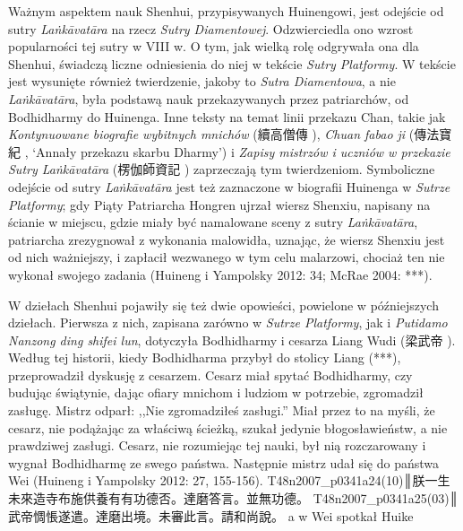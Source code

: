 Ważnym aspektem nauk Shenhui, przypisywanych Huinengowi, jest odejście od sutry \textit{La\.nkā\-vatāra} na rzecz \textit{Sutry Diamentowej}. Odzwierciedla ono wzrost popularności tej sutry w VIII w. O tym, jak wielką rolę odgrywała ona dla Shenhui, świadczą liczne odniesienia do niej w tekście \textit{Sutry Platformy}. W tekście jest wysunięte również twierdzenie, jakoby to \textit{Sutra Diamentowa}, a nie \textit{La\.nkāvatāra}, była podstawą nauk przekazywanych przez patriarchów, od Bodhidharmy do Huinenga. Inne teksty na temat linii przekazu Chan, takie jak \textit{Kontynuowane biografie wybitnych mnichów} (續高僧傳 ), \textit{Chuan fabao ji} (傳法寶紀 , `Annały przekazu skarbu Dharmy') i \textit{Zapisy mistrzów i uczniów w przekazie Sutry La\.nkāvatāra} (楞伽師資記 ) zaprzeczają tym twierdzeniom. Symboliczne odejście od sutry \textit{La\.nkāvatāra} jest też zaznaczone w biografii Huinenga w \textit{Sutrze Platformy}; gdy Piąty Patriarcha Hongren ujrzał wiersz Shenxiu, napisany na ścianie w miejscu, gdzie miały być namalowane sceny z sutry \textit{La\.nkāvatāra}, patriarcha zrezygnował z wykonania malowidła, uznając, że wiersz Shenxiu jest od nich ważniejszy, i zapłacił wezwanego w tym celu malarzowi, chociaż ten nie wykonał swojego zadania (Huineng i Yampolsky 2012: 34; McRae 2004: ***).

W dziełach Shenhui pojawiły się też dwie opowieści, powielone w późniejszych dziełach. Pierwsza z nich, zapisana zarówno w \textit{Sutrze Platformy}, jak i \textit{Putidamo Nanzong ding shifei lun}, dotyczyła Bodhidharmy i cesarza Liang Wudi (梁武帝 ). Według tej historii, kiedy Bodhidharma przybył do stolicy Liang (***), przeprowadził dyskusję z cesarzem. Cesarz miał spytać Bodhidharmy, czy budując świątynie, dając ofiary mnichom i ludziom w potrzebie, zgromadził zasługę\fnm. Mistrz odparł: ,,Nie zgromadziłeś zasługi.'' Miał przez to na myśli, że cesarz, nie podążając za właściwą ścieżką, szukał jedynie błogosławieństw, a nie prawdziwej zasługi. Cesarz, nie rozumiejąc tej nauki, był nią rozczarowany i wygnał Bodhidharmę ze swego państwa. Następnie mistrz udał się do państwa Wei (Huineng i Yampolsky 2012: 27, 155-156).
T48n2007_p0341a24(10)║朕一生未來造寺布施供養有有功德否。達磨答言。並無功德。
T48n2007_p0341a25(03)║武帝惆悵遂遣。達磨出境。未審此言。請和尚說。
a w Wei spotkał Huike
\fi
{}

